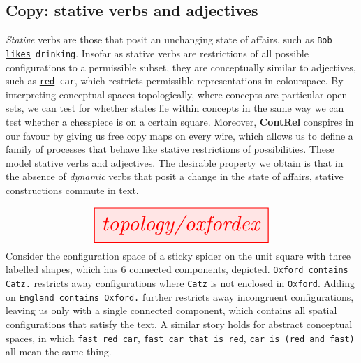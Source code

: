 \subsection{Copy: stative verbs and adjectives}
\emph{Stative} verbs are those that posit an unchanging state of affairs, such as \texttt{Bob \underline{likes} drinking}. Insofar as stative verbs are restrictions of all possible configurations to a permissible subset, they are conceptually similar to adjectives, such as \texttt{\underline{red} car}, which restricts permissible representations in colourspace. By interpreting conceptual spaces topologically, where concepts are particular open sets, we can test for whether states lie within concepts in the same way we can test whether a chesspiece is on a certain square. Moreover, \textbf{ContRel} conspires in our favour by giving us free copy maps on every wire, which allows us to define a family of processes that behave like stative restrictions of possibilities. These model stative verbs and adjectives. The desirable property we obtain is that in the absence of \emph{dynamic} verbs that posit a change in the state of affairs, stative constructions commute in text.
\begin{example}
\[\resizebox{0.6\textwidth}{!}{\tikzfig{topology/oxfordex}}\]
Consider the configuration space of a sticky spider on the unit square with three labelled shapes, which has 6 connected components, depicted. \texttt{Oxford contains Catz.} restricts away configurations where \texttt{Catz} is not enclosed in \texttt{Oxford}. Adding on \texttt{England contains Oxford.} further restricts away incongruent configurations, leaving us only with a single connected component, which contains all spatial configurations that satisfy the text. A similar story holds for abstract conceptual spaces, in which \texttt{fast red car}, \texttt{fast car that is red}, \texttt{car is (red and fast)} all mean the same thing.
\end{example}
\clearpage

